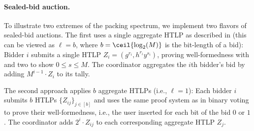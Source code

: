 \paragraph{Sealed-bid auction.}
To illustrate two extremes of the packing spectrum, we implement two flavors of sealed-bid auctions. The first uses a single aggregate HTLP as described in  (this can be viewed as $\ell = b$, where $b = \ceil{\log_2(M)}$ is the bit-length of a bid): Bidder $i$ submits a single HTLP $Z_i = (g^{r_i},h^{r_i} y^{s_i})$, proving well-formedness with \zkpoks and two \zkpopos to show $0\leq s\leq M$. The coordinator aggregates the $i$th bidder's bid by adding $M^{i-1} \cdot Z_i$ to its tally.

The second approach applies $b$ aggregate HTLPs (i.e., $\ell = 1$): Each bidder $i$ submits $b$ HTLPs $\{Z_{ij}\}_{j \in [b]}$ and uses the same proof system as in binary voting to prove their well-formedness, i.e., the user inserted for each bit of the bid $0$ or $1$. The coordinator adds $2^i \cdot Z_{ij}$ to each corresponding aggregate HTLP $Z_j$.%


